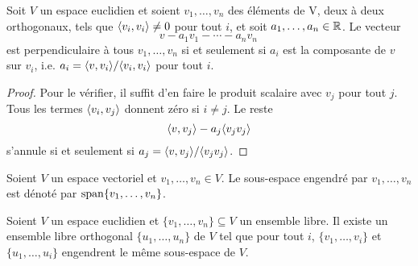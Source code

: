\begin{lemma}
  \label{lem:2}
  Soit $V$ un espace euclidien  et 
  soient $v_1,\dots,v_n$ des éléments de V, deux à deux orthogonaux, tels que $\langle {v_i,v_i} \rangle\neq 0$ pour tout $i$, et soit $a_1,\dots,a_n \in \mathbb{R}$.
  Le vecteur 
\begin{displaymath}
  v - a_1v_1- \cdots - a_n v_n\, %
\end{displaymath}
est perpendiculaire à tous $v_1,\dots,v_n$ si et seulement si $a_i$ est la composante de $v$ sur $v_i$, i.e. $a_i=  \langle {v,v_i} \rangle/ \langle {v_i,v_i} \rangle$ pour tout $i$. 
\end{lemma}

\begin{proof}
  Pour le vérifier, il suffit d'en faire le produit scalaire avec $v_j$ pour tout $j$. Tous les termes $\langle {v_i,v_j} \rangle$ donnent zéro si $i\neq j$. Le reste
  \begin{displaymath}
    \langle {v,v_j} \rangle - a_j\langle {v_jv_j} \rangle
  \end{displaymath}
s'annule si et seulement si $a_j = \langle {v,v_j} \rangle/\langle {v_jv_j} \rangle$. 
\end{proof}



\begin{notation}
  Soient $V$ un espace vectoriel et $v_1,\dots,v_n \in V$. Le sous-espace engendré par $v_1,\dots,v_n$ est dénoté par  $\operatorname{span}\{v_1,\dots,v_n\}$. 
\end{notation}



\begin{theorem}
  \label{thr:2}
  Soient $V$ un espace euclidien et  $\{v_1,\dots,v_n\} \subseteq V$
  un ensemble libre.  
  Il existe un ensemble libre orthogonal $\{u_1,\dots,u_n\}$
  de $V$
  tel que pour tout $i$, 
  $\{v_1,\dots,v_i\}$
  et $\{u_1,\dots,u_i\}$ engendrent le même sous-espace de $V$.
\end{theorem}


